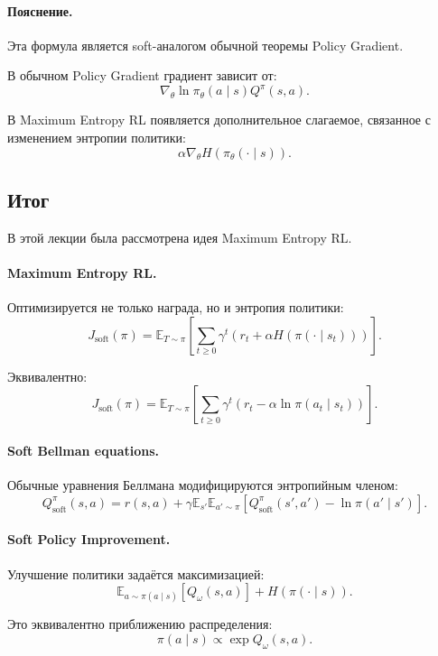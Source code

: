 \documentclass[12pt,a4paper]{article}
\begin{document}
\paragraph{Пояснение.}

Эта формула является soft-аналогом обычной теоремы Policy Gradient.

В обычном Policy Gradient градиент зависит от:
\[
\nabla_\theta\ln\pi_\theta(a\mid s)
Q^\pi(s,a).
\]

В Maximum Entropy RL появляется дополнительное слагаемое, связанное с изменением энтропии политики:
\[
\alpha\nabla_\theta H(\pi_\theta(\cdot\mid s)).
\]

\subsection{Итог}

В этой лекции была рассмотрена идея Maximum Entropy RL.

\paragraph{Maximum Entropy RL.}

Оптимизируется не только награда, но и энтропия политики:
\[
J_{\mathrm{soft}}(\pi)
=
\mathbb E_{T\sim\pi}
\left[
\sum_{t\ge 0}
\gamma^t
\left(
r_t
+
\alpha H(\pi(\cdot\mid s_t))
\right)
\right].
\]

Эквивалентно:
\[
J_{\mathrm{soft}}(\pi)
=
\mathbb E_{T\sim\pi}
\left[
\sum_{t\ge 0}
\gamma^t
\left(
r_t
-
\alpha\ln\pi(a_t\mid s_t)
\right)
\right].
\]

\paragraph{Soft Bellman equations.}

Обычные уравнения Беллмана модифицируются энтропийным членом:
\[
Q^\pi_{\mathrm{soft}}(s,a)
=
r(s,a)
+
\gamma
\mathbb E_{s'}
\mathbb E_{a'\sim\pi}
\left[
Q^\pi_{\mathrm{soft}}(s',a')
-
\ln\pi(a'\mid s')
\right].
\]

\paragraph{Soft Policy Improvement.}

Улучшение политики задаётся максимизацией:
\[
\mathbb E_{a\sim\pi(a\mid s)}
\left[
Q_\omega(s,a)
\right]
+
H(\pi(\cdot\mid s)).
\]

Это эквивалентно приближению распределения:
\[
\pi(a\mid s)
\propto
\exp Q_\omega(s,a).
\]
\end{document}
